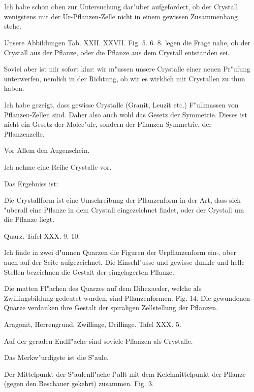 \documentclass[a4paper, 11pt, oneside, german]{article}
\begin{document}
\section{}
\paragraph{}
Ich habe schon oben zur Untersuchung dar"uber aufgefordert, ob der Crystall wenigstens mit der Ur-Pflanzen-Zelle nicht in einem gewissen Zusammenhang stehe.

Unsere Abbildungen Tab. XXII. XXVII. Fig. 5. 6. 8. legen die Frage nahe, ob der Crystall aus der Pflanze, oder die Pflanze aus dem Crystall entstanden sei.

Soviel aber ist mir sofort klar: wir m"ussen unsere Crystalle einer neuen Pr"ufung unterwerfen, nemlich in der Richtung, ob wir es wirklich mit Crystallen zu thun haben.

Ich habe gezeigt, dass gewisse Crystalle (Granit, Leuzit etc.) F"ullmassen von Pflanzen-Zellen sind. Daher also auch wohl das Gesetz der Symmetrie. Dieses ist nicht ein Gesetz der Molec"ule, sondern der Pflanzen-Symmetrie, der Pflanzenzelle.

Vor Allem den Augenschein.

Ich nehme eine Reihe Crystalle vor.

Das Ergebniss ist:

Die Crystallform ist eine Umschreibung der Pflanzenform in der Art, dass sich "uberall eine Pflanze in dem Crystall eingezeichnet findet, oder der Crystall um die Pflanze liegt.

Quarz. Tafel XXX. 9. 10.

Ich finde in zwei d"unnen Quarzen die Figuren der Urpflanzenform ein-, aber auch auf der Seite aufgezeichnet. Die Einschl"usse und gewisse dunkle und helle Stellen bezeichnen die Gestalt der eingelagerten Pflanze.

Die matten Fl"achen des Quarzes auf dem Dihexaeder, welche als Zwillingsbildung gedeutet wurden, sind Pflanzenformen. Fig. 14. Die gewundenen Quarze verdanken ihre Gestalt der spiraligen Zellstellung der Pflanzen.

Aragonit, Herrengrund. Zwillinge, Drillinge. Tafel XXX. 5.

Auf der geraden Endfl"ache sind soviele Pflanzen als Crystalle.

Das Merkw"urdigste ist die S"aule.

Der Mittelpunkt der S"aulenfl"ache f"allt mit dem Kelchmittelpunkt der Pflanze (gegen den Beschauer gekehrt) zusammen. Fig. 3.
\end{document}
